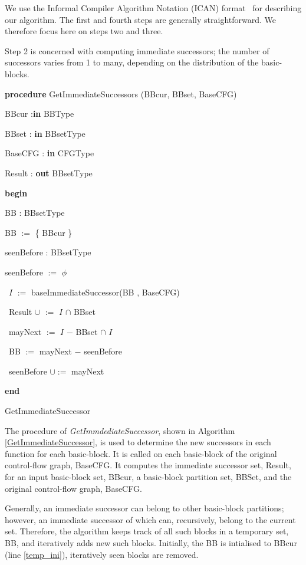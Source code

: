 \documentclass[3p,times,procedia,twocolumn,letterpaper]{elsarticle}
\begin{document}
We use the Informal Compiler Algorithm Notation (ICAN) format~\cite{j} for describing our algorithm. The first and fourth steps are generally straightforward. We therefore focus here on steps two and three.
 
Step 2 is concerned with computing immediate successors; the number of successors varies from 1 to many, depending on the distribution of the basic-blocks.

\begin{algorithm}
{\bfseries procedure} GetImmediateSuccessors (BBcur, BBset, BaseCFG)

BBcur :{\bfseries  in} BBType
 
BBset : {\bfseries in} BBsetType

BaseCFG : {\bfseries in} CFGType

Result : {\bfseries out} BBsetType



{\bfseries begin} 

BB : BBsetType

BB $:=$ \{ BBcur \}
\label{temp_ini}

seenBefore : BBsetType

seenBefore $:=$ $\phi$ 

\nl{}  { 
\label{l0}

\ $I$ $:=$ baseImmediateSuccessor(BB , BaseCFG) 
\label{l1}

\ Result $\cup$ $:=$ $I$ $\cap$ BBset
\label{l2} 
 
\ mayNext $:=$ $I$ $-$ BBset $\cap$ $I$
\label{l3}

\ BB $:=$ mayNext $-$ seenBefore
\label{l4}

\ seenBefore $\cup :=$ mayNext
\label{l5}
}
{\bfseries end}

\caption{GetImmediateSuccessor}
\label{GetImmediateSuccessor}
\end{algorithm}

The procedure of \emph{GetImmdediateSuccessor}, shown in Algorithm \ref{GetImmediateSuccessor}, is used to determine the new successors in each function for each basic-block. It is called on each basic-block of the original control-flow graph, BaseCFG. It computes the immediate successor set, Result, for an input basic-block set, BBcur, a basic-block partition set, BBSet, and the original control-flow graph, BaseCFG.

Generally, an immediate successor can belong to other basic-block partitions; however, an immediate successor of which can, recursively, belong to the current set. Therefore, the algorithm keeps track of all such blocks in a temporary set, BB, and iteratively adds new such blocks. Initially, the BB is intialised to BBcur (line \ref{temp_ini}), iteratively seen blocks are removed.
\end{document}
